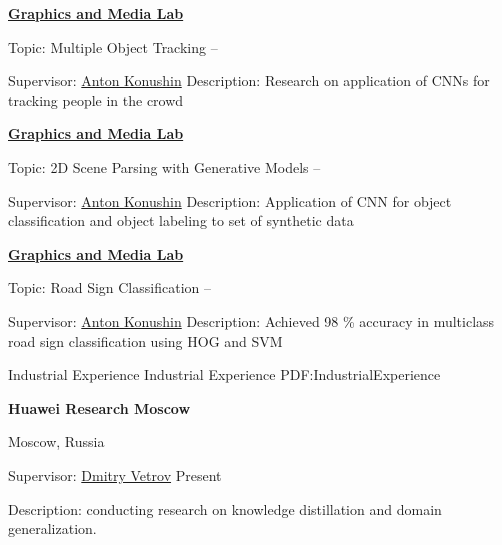 \documentclass[letterpaper,MMMyyyy,nonstopmode]{simpleresumecv}
\begin{document}
\begin{Body}
\Entry
\href{https://graphics.cs.msu.ru}
{\textbf{Graphics and Media Lab}}

\Gap
\BulletItem
Topic: Multiple Object Tracking
\hfill
{} --
\begin{Detail}
\SubBulletItem
Supervisor:
\href{https://www.hse.ru/en/staff/akonushin}{Anton Konushin}
\SubBulletItem
Description:
Research on application of CNNs for tracking people in the crowd
\end{Detail}

\Gap

\Entry
\href{https://graphics.cs.msu.ru}
{\textbf{Graphics and Media Lab}}

\Gap
\BulletItem
Topic: 2D Scene Parsing with Generative Models
\hfill
{} --
\begin{Detail}
\SubBulletItem
Supervisor:
\href{https://www.hse.ru/en/staff/akonushin}{Anton Konushin}
\SubBulletItem
Description:
Application of CNN for object classification and object labeling to \newline
set of synthetic data
\end{Detail}

\Gap

\Entry
\href{https://graphics.cs.msu.ru}
{\textbf{Graphics and Media Lab}}

\Gap
\BulletItem
Topic: Road Sign Classification
\hfill
{} --
\begin{Detail}
\SubBulletItem
Supervisor:
\href{https://www.hse.ru/en/staff/akonushin}{Anton Konushin}
\SubBulletItem
Description:
Achieved 98 \% accuracy in multiclass road sign classification \newline
using HOG and SVM
\end{Detail}



\Section
{Industrial Experience}
{Industrial Experience}
{PDF:IndustrialExperience}

\Entry
\textbf{Huawei Research Moscow}
\par
Moscow, Russia

\Gap
\BulletItem
Supervisor: \href{https://bayesgroup.ru/people/dmitry-vetrov/}{Dmitry Vetrov}
\hfill
Present
\begin{Detail}
\SubBulletItem
Description: conducting research on knowledge distillation and domain generalization.
\end{Detail}


\end{Body}
\end{document}
